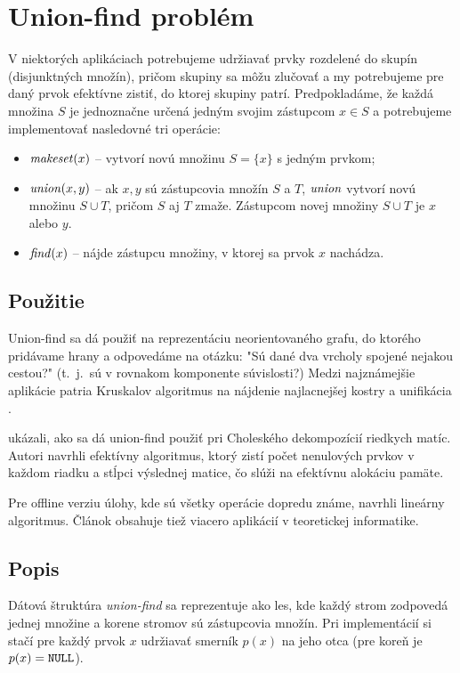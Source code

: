 \chapter{Union-find problém}\label{chap:uf}

V niektorých aplikáciach potrebujeme udržiavať prvky rozdelené do skupín
(disjunktných množín), pričom skupiny sa môžu zlučovať a my potrebujeme
pre daný prvok efektívne zistiť, do ktorej skupiny patrí. Predpokladáme,
že každá množina $S$ je jednoznačne určená jedným svojim zástupcom $x\in S$
a potrebujeme implementovať nasledovné tri operácie:

\begin{itemize}
\item $\mathop{\mathit{makeset}}(x)$ -- vytvorí novú množinu $S=\{x\}$ s jedným prvkom; %
\item $\mathop{\mathit{union}}(x, y)$ -- ak $x, y$ sú zástupcovia množín $S$ a $T$,
                 $\mathop{\mathit{union}}$ vytvorí novú množinu $S\cup T$,
                 pričom $S$ aj $T$ zmaže. Zástupcom novej množiny $S\cup T$
                 je $x$ alebo $y$.
\item $\mathop{\mathit{find}}(x)$ -- nájde zástupcu množiny, v ktorej sa 
                prvok $x$ nachádza.
\end{itemize}
 
\section{Použitie}\label{sec:uf-pouzitie}

Union-find sa dá použiť na reprezentáciu neorientovaného grafu,
do ktorého pridávame hrany a odpovedáme na otázku: "Sú dané dva
vrcholy spojené nejakou cestou?" (t.~j.\ sú v rovnakom komponente súvislosti?)
Medzi najznámejšie aplikácie patria Kruskalov algoritmus na nájdenie najlacnejšej
kostry \citep{kruskal} a unifikácia \citep{unif}.

\citet{cholesky} ukázali, ako sa dá union-find použiť pri Choleského dekompozícií
riedkych matíc. Autori navrhli efektívny algoritmus, ktorý zistí počet nenulových
prvkov v každom riadku a stĺpci výslednej matice, čo slúži na efektívnu alokáciu
pamäte.

Pre offline verziu úlohy, kde sú všetky operácie dopredu známe, \citet{offline-uf}
navrhli lineárny algoritmus. Článok obsahuje tiež viacero aplikácií v teoretickej
informatike.

\section{Popis}
Dátová štruktúra \emph{union-find} sa reprezentuje ako les, kde každý strom zodpovedá
jednej množine a korene stromov sú zástupcovia množín. Pri implementácií si
stačí pre každý prvok $x$ udržiavať smerník $p(x)$ na jeho otca
(pre koreň je $p(x)=\texttt{NULL}$).

